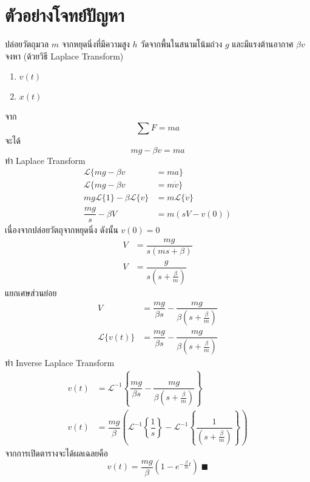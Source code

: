 \documentclass[a4paper,12pt]{article}
\begin{document}
\section{ตัวอย่างโจทย์ปัญหา}
\indent ปล่อยวัตถุมวล $m$ จากหยุดนิ่งที่มีความสูง $h$ วัดจากพื้นในสนามโน้มถ่วง $g$ และมีแรงต้านอากาศ $\beta v$\\
จงหา (ด้วยวิธี Laplace Transform)
\begin{enumerate}
	\item $v(t)$
	\item $x(t)$
\end{enumerate}
จาก
\begin{equation}
	\sum F=ma
\end{equation}
จะได้
\begin{equation}
	mg-\beta v=ma
\end{equation}\label{eq:meq}
ทำ Laplace Transform
\begin{align*}
	\mathscr{L}\{mg-\beta v                   & =ma\}                    \\
	\mathscr{L}\{mg-\beta v                   & =m\dot{v}\}              \\
	mg\mathscr{L}\{1\}-\beta \mathscr{L}\{v\} & =m\mathscr{L}\{\dot{v}\} \\
	\dfrac{mg}{s}-\beta V                     & =m(sV-v(0))
\end{align*}
เนื่องจากปล่อยวัตถุจากหยุดนิ่ง ดังนั้น $v(0)=0$
\begin{align*}
	V & =\dfrac{mg}{s(ms+\beta)}         \\
	V & =\dfrac{g}{s(s+\frac{\beta}{m})}
\end{align*}
แยกเศษส่วนย่อย
\begin{align*}
	V                   & =\dfrac{mg}{\beta s}-\dfrac{mg}{\beta(s+\frac{\beta}{m})} \\
	\mathscr{L}\{v(t)\} & =\dfrac{mg}{\beta s}-\dfrac{mg}{\beta(s+\frac{\beta}{m})}
\end{align*}
ทำ Inverse Laplace Transform
\begin{align*}
	v(t) & =\mathscr{L}^{-1}\left\{\dfrac{mg}{\beta s}-\dfrac{mg}{\beta(s+\frac{\beta}{m})}\right\}                                                 \\
	v(t) & =\dfrac{mg}{\beta}\left(\mathscr{L}^{-1}\left\{\dfrac{1}{s}\right\}-\mathscr{L}^{-1}\left\{\dfrac{1}{(s+\frac{\beta}{m})}\right\}\right)
\end{align*}
จากการเปิดตารางจะได้ผลเฉลยคือ
\begin{equation*}
	v(t)=\dfrac{mg}{\beta}\left(1-e^{-\frac{\beta}{m}t}\right)\;\blacksquare
\end{equation*}
\end{document}
